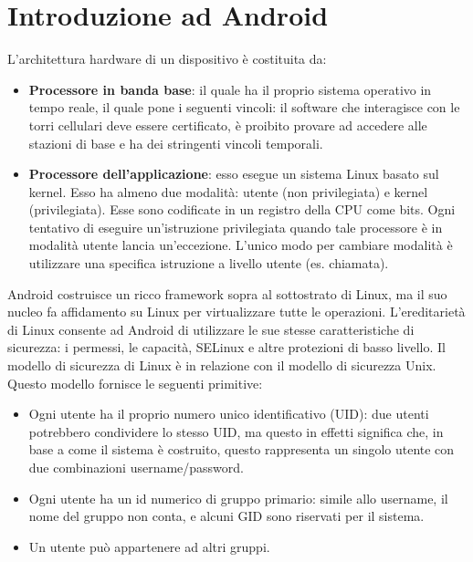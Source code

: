 \chapter{Introduzione ad Android}
L'architettura hardware di un dispositivo è costituita da:
\begin{itemize}
\item \textbf{Processore in banda base}: il quale ha il proprio sistema operativo in tempo reale, il quale pone i seguenti vincoli: il software che interagisce con le torri cellulari deve essere certificato, è proibito provare ad accedere alle stazioni di base e ha dei stringenti vincoli temporali.
\item \textbf{Processore dell'applicazione}: esso esegue un sistema Linux basato sul kernel. Esso ha almeno due modalità: utente (non privilegiata) e kernel (privilegiata). Esse sono codificate in un registro della CPU come bits. Ogni tentativo di eseguire un'istruzione privilegiata quando tale processore è in modalità utente lancia un'eccezione. L'unico modo per cambiare modalità è utilizzare una specifica istruzione a livello utente (es. chiamata). 
\end{itemize}
Android costruisce un ricco framework sopra al sottostrato di Linux, ma il suo nucleo fa affidamento su Linux per virtualizzare tutte le operazioni. L'ereditarietà di Linux consente ad Android di utilizzare le sue stesse caratteristiche di sicurezza: i permessi, le capacità, SELinux e altre protezioni di basso livello. Il modello di sicurezza di Linux è in relazione con il modello di sicurezza Unix. Questo modello fornisce le seguenti primitive:
\begin{itemize}
\item Ogni utente ha il proprio numero unico identificativo (UID): due utenti potrebbero condividere lo stesso UID, ma questo in effetti significa che, in base a come il sistema è costruito, questo rappresenta un singolo utente con due combinazioni username/password.
\item Ogni utente ha un id numerico di gruppo primario: simile allo username, il nome del gruppo non conta, e alcuni GID sono riservati per il sistema.
\item Un utente può appartenere ad altri gruppi.
\end{itemize}
